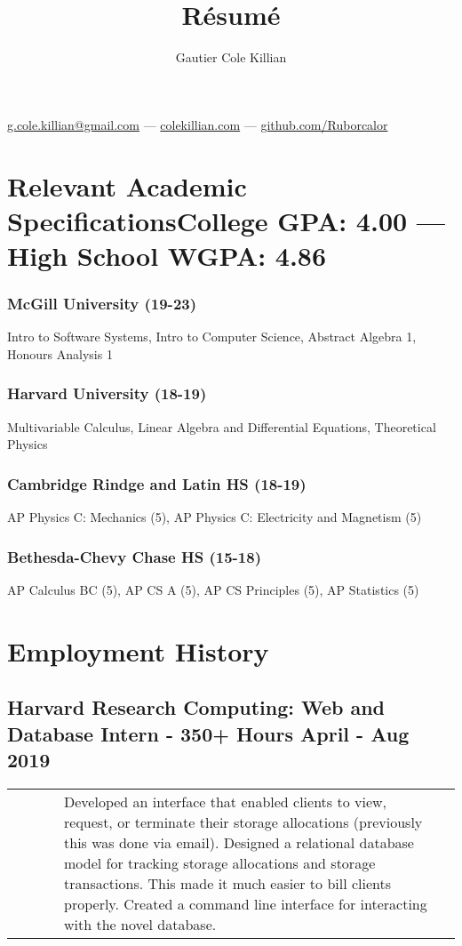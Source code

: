 \documentclass{article}
\makeatletter
\renewcommand{\maketitle}{
\begin{center}
{\color{green}\huge\bfseries
\theauthor}

\vspace{.25em}
\href{mailto:g.cole.killian@gmail.com}{g.cole.killian@gmail.com} --- \href{https://colekillian.com}{colekillian.com} --- \href{https://github.com/Ruborcalor}{github.com/Ruborcalor} 
\end{center}
}
\makeatother
\begin{document}
\title{R\'esum\'e}
\author{Gautier Cole Killian}

\maketitle


\section{Relevant Academic Specifications\hfill\normalsize College GPA: 4.00    ---     High School WGPA: 4.86}

\subsubsection{McGill University (19-23)}
\hfill Intro to Software Systems, Intro to Computer Science, Abstract Algebra 1, Honours Analysis 1

\subsubsection{Harvard University (18-19)}
\hfill Multivariable Calculus, Linear Algebra and Differential Equations, Theoretical Physics

\subsubsection{Cambridge Rindge and Latin HS (18-19)}
\hfill AP Physics C: Mechanics (5), AP Physics C: Electricity and Magnetism (5)

\subsubsection{Bethesda-Chevy Chase HS (15-18)}
\hfill AP Calculus BC (5), AP CS A (5), AP CS Principles (5), AP Statistics (5)

\section{Employment History}

\subsection{Harvard Research Computing: Web and Database Intern - 350+ Hours \hfill April - Aug 2019\newline}

\begin{tabularx}{\linewidth}{ @{} l X r @{} }
\ \ \ \ \ & Developed an interface that enabled clients to view, request, or terminate their storage allocations (previously this was done via email). Designed a relational database model for tracking storage allocations and storage transactions. This made it much easier to bill clients properly. Created a command line interface for interacting with the novel database.&
\end{tabularx}
\end{document}
